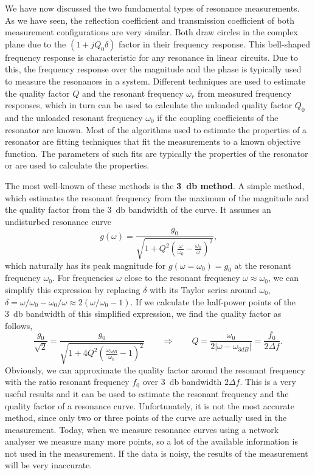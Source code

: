 We have now discussed the two fundamental types of resonance measurements. As we have seen, the reflection coefficient and transmission coefficient of both measurement configurations are very similar. Both draw circles in the complex plane due to the $(1+jQ_0\delta)$ factor in their frequency response. This bell-shaped frequency response is characteristic for any resonance in linear circuits. Due to this, the frequency response over the magnitude and the phase is typically used to measure the resonances in a system. Different techniques are used to estimate the quality factor $Q$ and the resonant frequency $\omega_r$ from measured frequency responses, which in turn can be used to calculate the unloaded quality factor $Q_0$ and the unloaded resonant frequency $\omega_0$ if the coupling coefficients of the resonator are known. Most of the algorithms used to estimate the properties of a resonator are fitting techniques that fit the measurements to a known objective function. The parameters of such fits are typically the properties of the resonator or are used to calculate the properties.

The most well-known of these methods is the \textbf{\SI{3}{\decibel} method}. A simple method, which estimates the resonant frequency from the maximum of the magnitude and the quality factor from the \SI{3}{\decibel} bandwidth of the curve. It assumes an undisturbed resonance curve 
\begin{equation}
g(\omega)=\frac{g_0}{\sqrt{1+Q^2(\frac{\omega}{\omega_0}-\frac{\omega_0}{\omega})^2}}\text{,}
\end{equation}
which naturally has its peak magnitude for $g(\omega=\omega_0)=g_0$ at the resonant frequency $\omega_0$. For frequencies $\omega$ close to the resonant frequency $\omega\approx\omega_0$, we can simplify this expression by replacing $\delta$ with its Taylor series around $\omega_0$, $\delta=\omega/\omega_0-\omega_0/\omega\approx 2(\omega/\omega_0-1)$. If we calculate the half-power points of the \SI{3}{\decibel} bandwidth of this simplified expression, we find the quality factor as follows,
\begin{equation}\label{eq:3dB}
\frac{g_0}{\sqrt{2}}=\frac{g_0}{\sqrt{1+4Q^2(\frac{\omega_{3dB}}{\omega_0}-1)^2}} \qquad\Rightarrow\qquad Q=\frac{\omega_0}{2|\omega-\omega_{3dB}|}=\frac{f_0}{2\Delta f}\text{.}
\end{equation}
Obviously, we can approximate the quality factor around the resonant frequency with the ratio resonant frequency $f_0$ over \SI{3}{\decibel} bandwidth $2\Delta f$. This is a very useful results and it can be used to estimate the resonant frequency and the quality factor of a resonance curve. Unfortunately, it is not the most accurate method, since only two or three points of the curve are actually used in the measurement. Today, when we measure resonance curves using a network analyser we measure many more points, so a lot of the available information is not used in the measurement. If the data is noisy, the results of the measurement will be very inaccurate.

